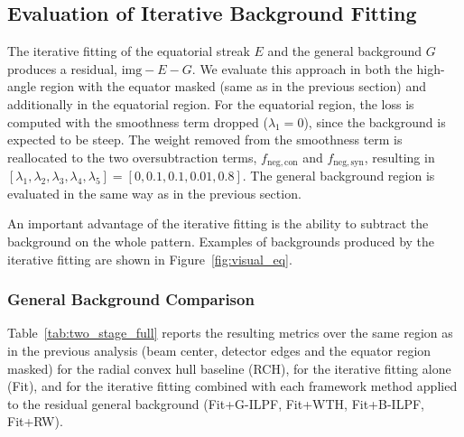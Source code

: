\documentclass[journal,article,submit,moreauthors]{Definitions/mdpi}
\begin{document}
\subsection{Evaluation of Iterative Background Fitting}
\label{sec:two_stage_eval}

The iterative fitting of the equatorial streak $E$ and the general background $G$ produces a residual, $\mathrm{img} - E - G$. We evaluate this approach in both the high-angle region with the equator masked (same as in the previous section) and additionally in the equatorial region. For the equatorial region, the loss is computed with the smoothness term dropped ($\lambda_1 = 0$), since the background is expected to be steep. The weight removed from the smoothness term is reallocated to the two oversubtraction terms, $f_{\mathrm{neg,con}}$ and $f_{\mathrm{neg,syn}}$, resulting in $[\lambda_1, \lambda_2, \lambda_3, \lambda_4, \lambda_5] = [0, 0.1, 0.1, 0.01, 0.8]$. The general background region is evaluated in the same way as in the previous section.

An important advantage of the iterative fitting is the ability to subtract the background on the whole pattern. Examples of backgrounds produced by the iterative fitting are shown in Figure~\ref{fig:visual_eq}.

\subsubsection{General Background Comparison}

Table~\ref{tab:two_stage_full} reports the resulting metrics over the same region as in the previous analysis (beam center, detector edges and the equator region masked) for the radial convex hull baseline (RCH), for the iterative fitting alone (Fit), and for the iterative fitting combined with each framework method applied to the residual general background (Fit+G-ILPF, Fit+WTH, Fit+B-ILPF, Fit+RW).
\end{document}
